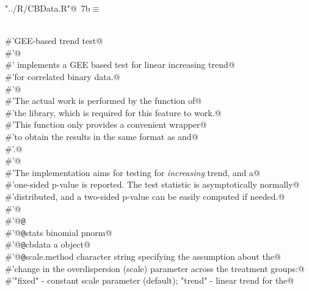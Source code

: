 \documentclass[reqno]{amsart}
\renewcommand{\NWtarget}[2]{\hypertarget{#1}{#2}}
\begin{document}
\begin{flushleft} \small\label{scrap12}\raggedright\small
\NWtarget{nuweb7b}{} \verb@"../R/CBData.R"@\nobreak\ {\footnotesize {7b}}$\equiv$
\vspace{-1ex}
\begin{list}{}{} \item
\mbox{}\verb@@\\
\mbox{}\verb@#'GEE-based trend test@\\
\mbox{}\verb@#'@\\
\mbox{}\verb@#' implements a GEE based test for linear increasing trend@\\
\mbox{}\verb@#'for correlated binary data.@\\
\mbox{}\verb@#'@\\
\mbox{}\verb@#'The actual work is performed by the  function of@\\
\mbox{}\verb@#'the  library, which is required for this feature to work.@\\
\mbox{}\verb@#'This function only provides a convenient wrapper@\\
\mbox{}\verb@#'to obtain the results in the same format as  and@\\
\mbox{}\verb@#'.@\\
\mbox{}\verb@#'@\\
\mbox{}\verb@#'The implementation aims for testing for \emph{increasing} trend, and a@\\
\mbox{}\verb@#'one-sided p-value is reported. The test statistic is asymptotically normally@\\
\mbox{}\verb@#'distributed, and a two-sided p-value can be easily computed if needed.@\\
\mbox{}\verb@#'@\\
\mbox{}\verb@#'@{\tt @}\verb@export@\\
\mbox{}\verb@#'@{\tt @}\verb@importFrom stats binomial pnorm@\\
\mbox{}\verb@#'@{\tt @}\verb@param cbdata a  object@\\
\mbox{}\verb@#'@{\tt @}\verb@param scale.method character string specifying the assumption about the@\\
\mbox{}\verb@#'change in the overdispersion (scale) parameter across the treatment groups:@\\
\mbox{}\verb@#'"fixed" - constant scale parameter (default); "trend" - linear trend for the@\\

\end{list}
\end{flushleft}
\end{document}
